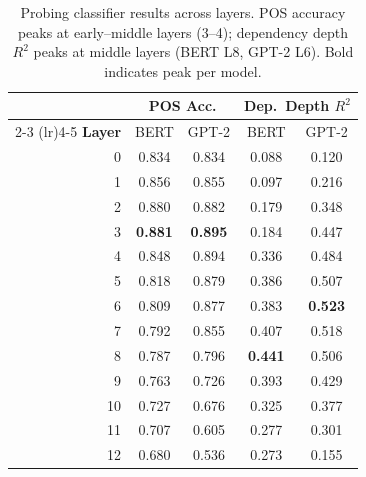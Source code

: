 \documentclass[11pt]{article}
\begin{document}
\begin{table}[t]
\centering
\small
\begin{tabular}{r cc cc}
\toprule
& \multicolumn{2}{c}{\textbf{POS Acc.}} & \multicolumn{2}{c}{\textbf{Dep.\ Depth $R^2$}} \\
\cmidrule(lr){2-3} \cmidrule(lr){4-5}
\textbf{Layer} & BERT & GPT-2 & BERT & GPT-2 \\
\midrule
0  & 0.834 & 0.834 & 0.088 & 0.120 \\
1  & 0.856 & 0.855 & 0.097 & 0.216 \\
2  & 0.880 & 0.882 & 0.179 & 0.348 \\
3  & \textbf{0.881} & \textbf{0.895} & 0.184 & 0.447 \\
4  & 0.848 & 0.894 & 0.336 & 0.484 \\
5  & 0.818 & 0.879 & 0.386 & 0.507 \\
6  & 0.809 & 0.877 & 0.383 & \textbf{0.523} \\
7  & 0.792 & 0.855 & 0.407 & 0.518 \\
8  & 0.787 & 0.796 & \textbf{0.441} & 0.506 \\
9  & 0.763 & 0.726 & 0.393 & 0.429 \\
10 & 0.727 & 0.676 & 0.325 & 0.377 \\
11 & 0.707 & 0.605 & 0.277 & 0.301 \\
12 & 0.680 & 0.536 & 0.273 & 0.155 \\
\bottomrule
\end{tabular}
\caption{Probing classifier results across layers. POS accuracy peaks at early--middle layers (3--4); dependency depth $R^2$ peaks at middle layers (BERT L8, GPT-2 L6). Bold indicates peak per model.}
\label{tab:probing}
\end{table}
\end{document}
